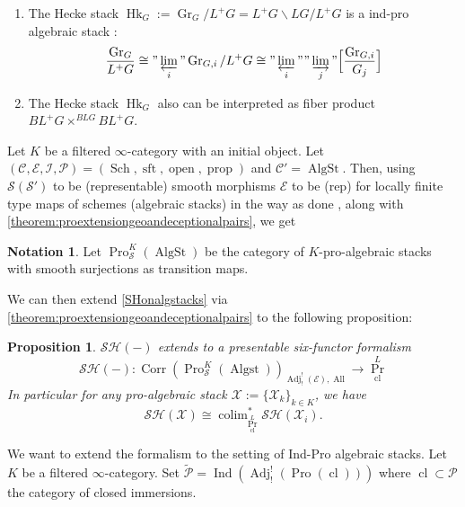 \documentclass[14pt]{article}
\newtheorem{proposition}[theorem]{Proposition}
\theoremstyle{definition}
\newtheorem{notation}[theorem]{Notation}
\newcommand{\E}{\mathcal{E}}
\renewcommand{\P}{\mathcal{P}}
\newcommand{\op}[1]{\operatorname{#1}}
\renewcommand{\S}{\mathcal{S}}
\newcommand{\I}{\mathscr{I}}
\newcommand{\Ca}{\mathcal{C}}
\newcommand{\X}{\mathcal{X}}
\numberwithin{subsection}{section}
\newcommand{\SH}{\mathcal{SH}}
\begin{document}
\begin{enumerate}
    By \cite[Lemma 4.3.3]{richarzscholbachintersectionmotive}, it follows that the action of $L^+G$ on $\op{Gr}_G$ gives a $L^+G$-stable presentation of 
    \begin{equation}
        \op{Gr}_G \cong \op{colim}_i \op{Gr}_{G,i}
    \end{equation}
    such that the $L^+G$ action on $\op{Gr}_{G,j}$ factors via $G_i$ for some $i$. Morever each $\op{Gr}_{G,j}$ is a projective $\mathbf{Z}$-scheme.
    \item The Hecke stack $\op{Hk}_G:=\op{Gr}_G/L^+G = L^+G \backslash LG /L^+G$ is a ind-pro algebraic stack :
    \begin{equation}\label{Heckestackindprodescription}
        \frac{\op{Gr}_G}{L^+G} \cong "\varprojlim_i" \op{Gr}_{G,i}/L^+G \cong "\varprojlim_i" "\varinjlim_j" \Big[\frac{\op{Gr}_{G,i}}{G_j}\Big]
    \end{equation}

\item  The Hecke stack $\op{Hk}_G$ also can be interpreted as fiber product $BL^+G \times^{BLG} BL^+G$.
\end{enumerate}
Let $K$ be a filtered $\infty$-category with an initial object. Let $(\Ca,\E,\I,\P)= (\op{Sch},\op{sft},\op{open},\op{prop})$ and  $\Ca' = \op{AlgSt}$. Then, using  $\S (\S')$ to be (representable) smooth morphisms $\E$ to be (rep) for locally finite type maps of schemes (algebraic stacks) in the way as done \cite{chowdhury2025nonrepresentablesixfunctorformalisms}, along with \cref{theorem:proextensiongeoandeceptionalpairs}, we get
\begin{notation}
  
 Let    $\op{Pro}^K_{\S}(\op{AlgSt})$ be the category of $K$-pro-algebraic stacks with smooth surjections as transition maps.
    \end{notation}
We can then extend \cref{SHonalgstacks} via \cref{theorem:proextensiongeoandeceptionalpairs} to the following proposition:
\begin{proposition}
    $\SH(-)$ extends to a presentable six-functor formalism
    \begin{equation}
        \SH(-): \op{Corr}(\op{Pro}^K_{\S}(\op{Algst}))_{\op{Adj}^!_!(\E),\op{All}} \to \op{Pr}^L_{\op{cl}}
    \end{equation}
    In particular for any pro-algebraic stack $\X:=\{\X_k\}_{k \in K}$, we have
    \begin{equation}
        \SH(\X) \cong \op{colim}_{\op{Pr}^L_{\op{cl}}}^*\SH(\X_i) .
    \end{equation}
\end{proposition}
We want to extend the formalism to the setting of Ind-Pro algebraic stacks. Let $K$ be a filtered $\infty$-category. Set $\tilde{\P} = \op{Ind}(\op{Adj}^!_!(\op{Pro}(\op{cl})))$ where $\op{cl} \subset \P$ the category of closed immersions. 
\end{document}
